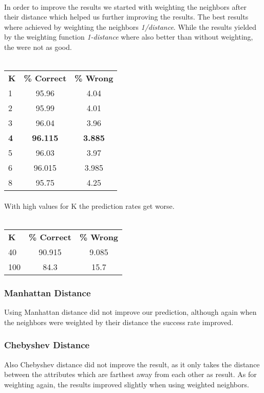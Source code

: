 \documentclass{article}
\begin{document}
\paragraph{}In order to improve the results we started with weighting the neighbors after their distance which helped us further improving the results. The best results where achieved by weighting the neighbors \emph{1/distance}. While the results yielded by the weighting function \emph{1-distance} where also better than without weighting, the were not as good.
\\\\
\begin{center}
\begin{tabular}{ l | c | c }
\textbf{K} & \textbf{\% Correct} & \textbf{\% Wrong} \\
1 & 95.96 & 4.04 \\
2 & 95.99& 4.01\\
3 & 96.04 & 3.96 \\
\textbf{4} & \textbf{96.115} & \textbf{3.885} \\
5 & 96.03 & 3.97 \\
6 & 96.015 & 3.985 \\
8 & 95.75 & 4.25 \\
\end{tabular}
\end{center}
\paragraph{}With high values for K the prediction rates get worse. 
\\\\
\begin{center}
\begin{tabular}{ l | c | c }
\textbf{K} & \textbf{\% Correct} & \textbf{\% Wrong} \\
40 & 90.915 & 9.085 \\
100 &  84.3 & 15.7 \\
\end{tabular}
\end{center}
\subsubsection{Manhattan Distance} Using Manhattan distance did not improve our prediction, although again when the neighbors were weighted by their distance the success rate improved.
\subsubsection{Chebyshev Distance} Also Chebyshev distance did not improve the result, as it only takes the distance between the attributes which are farthest away from each other as result. As for weighting again, the results improved slightly when using weighted neighbors.
\end{document}

